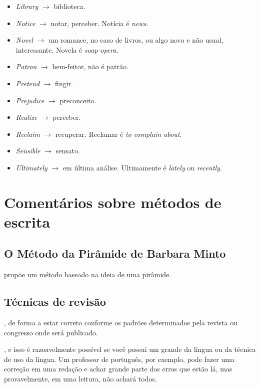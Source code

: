 \documentclass[openany]{book}
\begin{document}
\begin{itemize}
    \item \textit{Library} $\rightarrow$ biblioteca.
    \item \textit{Notice} $\rightarrow$ notar, perceber. Notícia é \textit{news}.
    \item \textit{Novel} $\rightarrow$ um romance, no caso de livros, ou algo novo e não usual, interessante. Novela é \textit{soap-opera}.
    \item \textit{Patron} $\rightarrow$ bem-feitor, não é patrão.
    \item \textit{Pretend} $\rightarrow$ fingir.
    \item \textit{Prejudice} $\rightarrow$ preconceito.
    \item \textit{Realize} $\rightarrow$ perceber.
    \item \textit{Reclaim} $\rightarrow$ recuperar. Reclamar é \textit{to complain about}.
    \item \textit{Sensible} $\rightarrow$ sensato.
    \item \textit{Ultimately} $\rightarrow$ em última análise. Ultimamente é \textit{lately} ou \textit{recently}.
    \end{itemize}


\chapter{Comentários sobre métodos de escrita}

\section{O Método da Pirâmide de Barbara Minto}

\citet{minto2009pyramid} propõe um método baseado na ideia de uma pirâmide.


\section{Técnicas de revisão}

, de forma a estar correto conforme os padrões determinados pela revista ou congresso onde será publicado.

, e isso é razoavelmente possível se você possui um grande da língua ou da técnica de uso da língua. Um professor de português, por exemplo, pode fazer uma correção em uma redação e achar grande parte dos erros que estão lá, mas provavelmente, em uma leitura, não achará todos.
\end{document}
